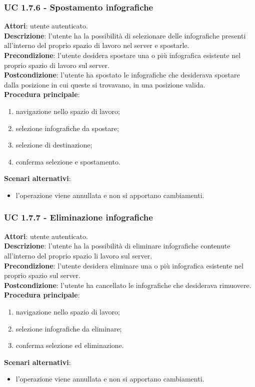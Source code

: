 	\subsubsection{UC 1.7.6 - Spostamento infografiche}{
		\label{uc1.7.6}
		\textbf{Attori}: utente autenticato.	\\
		\textbf{Descrizione}: l'utente ha la possibilità di selezionare delle infografiche presenti all'interno del proprio spazio di lavoro nel server e spostarle. \\
		\textbf{Precondizione}: l'utente desidera spostare una o più infografica esistente nel proprio spazio di lavoro sul server.	\\
		\textbf{Postcondizione}: l'utente ha spostato le infografiche che desiderava spostare dalla posizione in cui queste si trovavano, in una posizione valida.	\\
		\textbf{Procedura principale}:
		\begin{enumerate}
			\item navigazione nello spazio di lavoro;
			\item selezione infografiche da spostare;
			\item selezione di destinazione;
			\item conferma selezione e spostamento.
		\end{enumerate}
		\textbf{Scenari alternativi}: 
		\begin{itemize}
			\item l'operazione viene annullata e non si apportano cambiamenti.
		\end{itemize}
		}
	\subsubsection{UC 1.7.7 - Eliminazione infografiche}{
		\label{uc1.7.7}
		\textbf{Attori}: utente autenticato.	\\
		\textbf{Descrizione}: l'utente ha la possibilità di eliminare infografiche contenute all'interno del proprio spazio li lavoro sul server. \\
		\textbf{Precondizione}: l'utente desidera eliminare una o più infografica esistente nel proprio spazio sul server.	\\
		\textbf{Postcondizione}: l'utente ha cancellato le infografiche che desiderava rimuovere.	\\
		\textbf{Procedura principale}:
		\begin{enumerate}
			\item navigazione nello spazio di lavoro;
			\item selezione infografiche da eliminare;
			\item conferma selezione ed eliminazione.
		\end{enumerate}
		\textbf{Scenari alternativi}: 
		\begin{itemize}
			\item l'operazione viene annullata e non si apportano cambiamenti.
		\end{itemize}
		}
